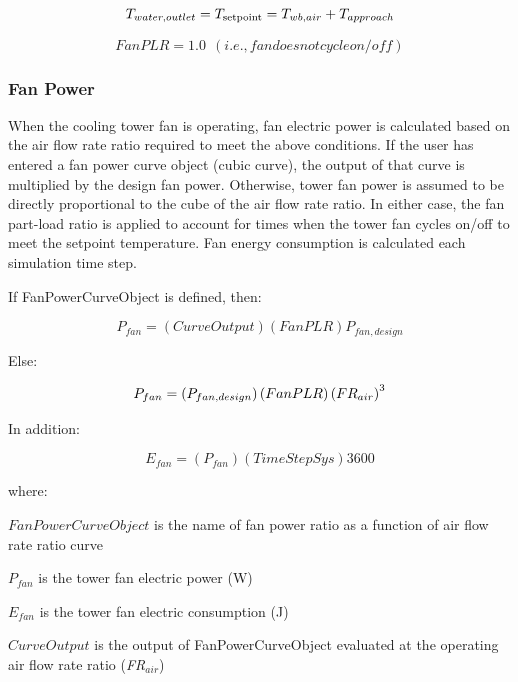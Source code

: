 \begin{equation}
{T_{water,outlet}} = {T_{{\rm{setpoint}}}} = {T_{wb,air}} + {T_{approach}}
\end{equation}

\begin{equation}
FanPLR = 1.0~~(i.e., fan does not cycle on/off)
\end{equation}

\subsubsection{Fan Power}\label{fan-power}

When the cooling tower fan is operating, fan electric power is calculated based on the air flow rate ratio required to meet the above conditions. If the user has entered a fan power curve object (cubic curve), the output of that curve is multiplied by the design fan power. Otherwise, tower fan power is assumed to be directly proportional to the cube of the air flow rate ratio. In either case, the fan part-load ratio is applied to account for times when the tower fan cycles on/off to meet the setpoint temperature. Fan energy consumption is calculated each simulation time step.

If FanPowerCurveObject is defined, then:

\begin{equation}
  P_{fan} = \left( {CurveOutput} \right)\left( {FanPLR} \right){P_{fan,design}}
\end{equation}

Else:

\begin{equation}
  P_{fan} = \left( {{P_{fan,design}}} \right)\left( {FanPLR} \right){\left( {F{R_{air}}} \right)^{\rm{3}}}
\end{equation}

In addition:

\begin{equation}
{E_{fan}} = \left( {{P_{fan}}} \right)\left( {TimeStepSys} \right)3600
\end{equation}

where:

\(FanPowerCurveObject\) is the name of fan power ratio as a function of air flow rate ratio curve

\({P_{fan}}\) is the tower fan electric power (W)

\({E_{fan}}\) is the tower fan electric consumption (J)

\(CurveOutput\) is the output of FanPowerCurveObject evaluated at the operating air flow rate ratio (\emph{FR\(_{air}\)})

